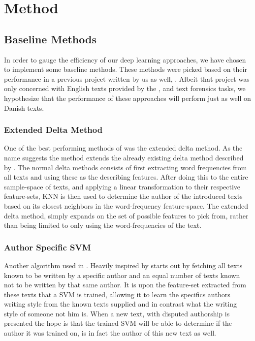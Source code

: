 \section{Method} \label{sec:method} 


\subsection{Baseline Methods}

In order to gauge the efficiency of our deep learning approaches, we have
chosen to implement some baseline methods. These methods were picked
based on their performance in a previous project written by us as well,
\cite{US}. Albeit that project was only concerned with English texts
provided by the \cite{pan:2015}, and \cite{pan:2014} text forensics tasks,
we hypothesize that the performance of these approaches will perform just
as well on Danish texts.


\subsubsection{Extended Delta Method}

One of the best performing methods of \cite{US} was the extended delta method.
As the name suggests the method extends the already existing delta method
described by \cite{evert2015towards}. The normal delta methods consists of first
extracting word frequencies from all texts and using these as the describing
features. After doing this to the entire sample-space of texts, and applying a
linear transformation to their respective feature-sets, \gls{KNN} is then used
to determine the author of the introduced texts based on its closest neighbors
in the word-frequency feature-space. The extended delta method, simply expands
on the set of possible features to pick from, rather than being limited to only
using the word-frequencies of the text.


\subsubsection{Author Specific SVM}

Another algorithm used in \cite{US}. Heavily inspired by \cite{hansen2014}
starts out by fetching all texts known to be written by a specific author and an
equal number of texts known not to be written by that same author. It is upon
the feature-set extracted from these texts that a \gls{SVM} is trained, allowing
it to learn the specifics authors writing style from the known texts supplied
and in contrast what the writing style of someone not him is. When a new text,
with disputed authorship is presented the hope is that the trained \gls{SVM}
will be able to determine if the author it was trained on, is in fact the author
of this new text as well.


